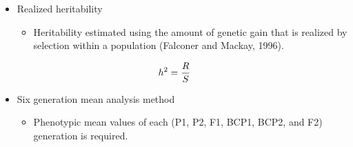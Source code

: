 \documentclass[11pt,ignorenonframetext,aspectratio=169]{beamer}
\providecommand{\tightlist}{%
  \setlength{\itemsep}{0pt}\setlength{\parskip}{0pt}}
\begin{document}
\begin{frame}{}
\protect\hypertarget{section-9}{}
\begin{itemize}
\tightlist
\item
  Realized heritability

  \begin{itemize}
  \tightlist
  \item
    Heritability estimated using the amount of genetic gain that is
    realized by selection within a population (Falconer and Mackay,
    1996).
  \end{itemize}
\end{itemize}

\[
\small
h^2 = \frac{R}{S}
\]

\begin{itemize}
\tightlist
\item
  Six generation mean analysis method

  \begin{itemize}
  \tightlist
  \item
    Phenotypic mean values of each (P1, P2, F1, BCP1, BCP2, and F2)
    generation is required.
  \end{itemize}
\end{itemize}
\end{frame}
\end{document}

